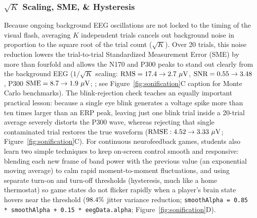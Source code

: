 \documentclass[11pt]{article}
\begin{document}
\subsubsection{$\sqrt{K}$ Scaling, SME, \& Hysteresis}
Because ongoing background EEG oscillations are not locked to the timing of the visual flash, averaging $K$ independent trials cancels out background noise in proportion to the square root of the trial count ($\sqrt{K}$). Over 20 trials, this noise reduction lowers the trial-to-trial Standardized Measurement Error (SME) by more than fourfold and allows the N170 and P300 peaks to stand out clearly from the background EEG ($1/\sqrt{K}$ scaling: $\text{RMS} = 17.4 \rightarrow 2.7\ \mu\text{V}$, $\text{SNR} = 0.55 \rightarrow 3.48$, P300 $\text{SME} = 8.7 \rightarrow 1.9\ \mu\text{V}$; \citealp{luck2021standardized,schubert2023enhancing}; see Figure~\ref{fig:sonification}C caption for Monte Carlo benchmarks). The blink-rejection check teaches an equally important practical lesson: because a single eye blink generates a voltage spike more than ten times larger than an ERP peak, leaving just one blink trial inside a 20-trial average severely distorts the P300 wave, whereas rejecting that single contaminated trial restores the true waveform ($\text{RMSE}: 4.52 \rightarrow 3.33\ \mu\text{V}$; Figure~\ref{fig:sonification}C). For continuous neurofeedback games, students also learn two simple techniques to keep on-screen control smooth and responsive: blending each new frame of band power with the previous value (an exponential moving average) to calm rapid moment-to-moment fluctuations, and using separate turn-on and turn-off thresholds (hysteresis, much like a home thermostat) so game states do not flicker rapidly when a player's brain state hovers near the threshold ($98.4\%$ jitter variance reduction; \texttt{smoothAlpha = 0.85 * smoothAlpha + 0.15 * eegData.alpha}; Figure~\ref{fig:sonification}D).
\end{document}
